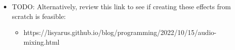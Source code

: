 \begin{itemize}
\item TODO: Alternatively, review this link to see if creating these effects from scratch is feasible: 
	\begin{itemize}
		\item https://lisyarus.github.io/blog/programming/2022/10/15/audio-mixing.html
	\end{itemize}
\end{itemize}


